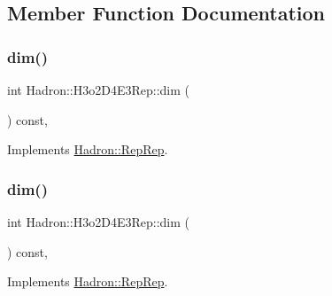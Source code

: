 \subsection{Member Function Documentation}
\mbox{\label{structHadron_1_1H3o2D4E3Rep_a4351e7e6c874fae945df9917ba9bf56d}} 
\subsubsection{\texorpdfstring{dim()}{dim()}\hspace{0.1cm}{\footnotesize\ttfamily [1/5]}}
{\footnotesize\ttfamily int Hadron\+::\+H3o2\+D4\+E3\+Rep\+::dim (\begin{DoxyParamCaption}{ }\end{DoxyParamCaption}) const\hspace{0.3cm}{\ttfamily [inline]}, {\ttfamily [virtual]}}



Implements \mbox{\hyperlink{structHadron_1_1RepRep_a92c8802e5ed7afd7da43ccfd5b7cd92b}{Hadron\+::\+Rep\+Rep}}.

\mbox{\label{structHadron_1_1H3o2D4E3Rep_a4351e7e6c874fae945df9917ba9bf56d}} 
\subsubsection{\texorpdfstring{dim()}{dim()}\hspace{0.1cm}{\footnotesize\ttfamily [2/5]}}
{\footnotesize\ttfamily int Hadron\+::\+H3o2\+D4\+E3\+Rep\+::dim (\begin{DoxyParamCaption}{ }\end{DoxyParamCaption}) const\hspace{0.3cm}{\ttfamily [inline]}, {\ttfamily [virtual]}}



Implements \mbox{\hyperlink{structHadron_1_1RepRep_a92c8802e5ed7afd7da43ccfd5b7cd92b}{Hadron\+::\+Rep\+Rep}}.

\mbox{\label{structHadron_1_1H3o2D4E3Rep_a4351e7e6c874fae945df9917ba9bf56d}} 

